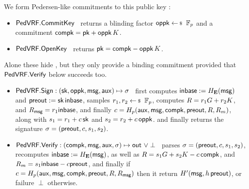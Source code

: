 \noindent We form Pedersen-like commitments to this public key \pk:
\begin{itemize}
\item ${\mathsf{PedVRF}}.{\mathsf{CommitKey}}$ \,
returns a blinding factor $\openpk \leftsample \F_p$
and a commitment $\mathsf{compk} = \mathsf{pk} + \mathsf{oppk} \, K$.
\item ${\mathsf{PedVRF}}.{\mathsf{OpenKey}}$ \,
returns $\mathsf{pk} = \mathsf{compk} - \mathsf{oppk} \, K$.
\end{itemize}
Alone these hide \pk, but they only provide a binding commitment
provided that ${\mathsf{PedVRF}}.{\mathsf{Verify}}$ below succeeds too.

\begin{itemize}
\item ${\mathsf{PedVRF}}.{\mathsf{Sign}} : (\mathsf{sk},\mathsf{oppk},\mathsf{msg},\mathsf{aux}) \mapsto \sigma$ \,
    first computes ${\mathsf{inbase}} := H_{{\mathbf{E}}}(\mathsf{msg})$ and ${\mathsf{preout}} := \mathsf{sk} \, {\mathsf{inbase}}$,
    samples $r_1,r_2 \leftsample \F_p$,
    computes $R = r_1 G + r_2 K$, and $R_\mathsf{msg} = r_1 {\mathsf{inbase}}$, and
    finally $c = H_p(\mathsf{aux},\mathsf{msg},\mathsf{compk},{\mathsf{preout}},R,R_m)$,
     along with $s_1 = r_1 + c \, \mathsf{sk}$ and $s_2 = r_2 + c \, \mathsf{oppk}$.
    and finally returns the signature $\sigma = ({\mathsf{preout}},c,s_1,s_2)$.
\item ${\mathsf{PedVRF}}.{\mathsf{Verify}} : (\mathsf{compk},\mathsf{msg},\mathsf{aux},\sigma) \mapsto {\ensuremath{\mathsf{out}}} \,\, \lor \perp$ \,
    parses $\sigma = ({\mathsf{preout}},c,s_1,s_2)$, 
    recomputes ${\mathsf{inbase}} := H_{{\mathbf{E}}}(\mathsf{msg})$, as well as
    $R = s_1 G + s_2 K - c \, \mathsf{compk}$, and
    $R_m = s_1 {\mathsf{inbase}} - c {\mathsf{preout}}$, and finally
    if $c = H_p(\mathsf{aux},\mathsf{msg},\mathsf{compk},{\mathsf{preout}},R,R_\mathsf{msg})$ then it return $H'(\mathsf{msg}, h \, {\mathsf{preout}})$, 
         or failure $\perp$ otherwise.
\end{itemize}

